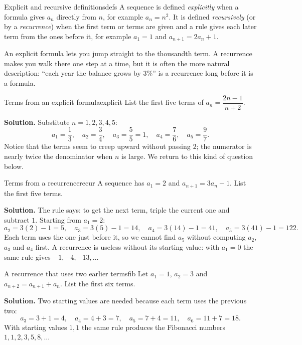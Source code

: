\documentclass[11pt]{article}
\begin{document}
\begin{defn}{Explicit and recursive definitions}{defs}
A sequence is defined \emph{explicitly} when a formula gives $a_n$ directly from $n$, for example $a_n=n^2$. It is defined \emph{recursively} (or by a \emph{recurrence}) when the first term or terms are given and a rule gives each later term from the ones before it, for example $a_1=1$ and $a_{n+1}=2a_n+1$.
\end{defn}

An explicit formula lets you jump straight to the thousandth term. A recurrence makes you walk there one step at a time, but it is often the more natural description: ``each year the balance grows by $3\%$'' is a recurrence long before it is a formula.

\begin{exmp}{Terms from an explicit formula}{explicit}
List the first five terms of $a_n=\dfrac{2n-1}{n+2}$.

\textbf{Solution.} Substitute $n=1,2,3,4,5$:
\[
a_1=\frac13,\quad a_2=\frac34,\quad a_3=\frac55=1,\quad a_4=\frac76,\quad a_5=\frac97 .
\]
Notice that the terms seem to creep upward without passing $2$; the numerator is nearly twice the denominator when $n$ is large. We return to this kind of question below.
\end{exmp}

\begin{exmp}{Terms from a recurrence}{recur}
A sequence has $a_1=2$ and $a_{n+1}=3a_n-1$. List the first five terms.

\textbf{Solution.} The rule says: to get the next term, triple the current one and subtract $1$. Starting from $a_1=2$:
\[
a_2=3(2)-1=5,\quad a_3=3(5)-1=14,\quad a_4=3(14)-1=41,\quad a_5=3(41)-1=122 .
\]
Each term uses the one just before it, so we cannot find $a_5$ without computing $a_2$, $a_3$ and $a_4$ first. A recurrence is useless without its starting value: with $a_1=0$ the same rule gives $-1,-4,-13,\dots$
\end{exmp}

\begin{exmp}{A recurrence that uses two earlier terms}{fib}
Let $a_1=1$, $a_2=3$ and $a_{n+2}=a_{n+1}+a_n$. List the first six terms.

\textbf{Solution.} Two starting values are needed because each term uses the previous two:
\[
a_3=3+1=4,\quad a_4=4+3=7,\quad a_5=7+4=11,\quad a_6=11+7=18 .
\]
With starting values $1,1$ the same rule produces the Fibonacci numbers $1,1,2,3,5,8,\dots$
\end{exmp}
\end{document}
